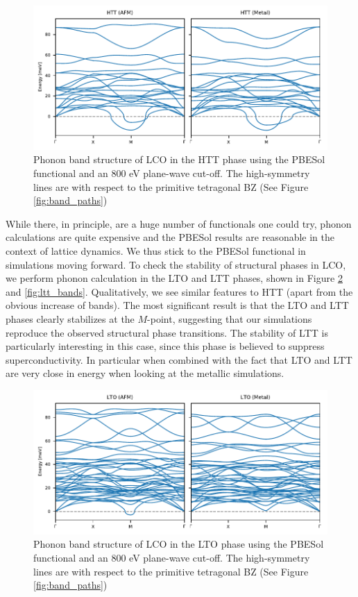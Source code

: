 \begin{figure}
	\centering
	\includegraphics[width=\textwidth]{fig/simulation/htt_bands.pdf}
	\caption[HTT Bands]{Phonon band structure of LCO in the HTT phase using the PBESol functional and an 800 eV plane-wave cut-off. The high-symmetry lines are with respect to the primitive tetragonal BZ (See Figure \ref{fig:band_paths})}
	\label{fig:htt_bands}
\end{figure}

While there, in principle, are a huge number of functionals one could try, phonon calculations are quite expensive and the PBESol results are reasonable in the context of lattice dynamics. We thus stick to the PBESol functional in simulations moving forward. To check the stability of structural phases in LCO, we perform phonon calculation in the LTO and LTT phases, shown in Figure \ref{fig:lto_bands} and \ref{fig:ltt_bands}. Qualitatively, we see similar features to HTT (apart from the obvious increase of bands). The most significant result is that the LTO and LTT phases clearly stabilizes at the $M$-point, suggesting that our simulations reproduce the observed structural phase transitions. The stability of LTT is particularly interesting in this case, since this phase is believed to suppress superconductivity. In particular when combined with the fact that LTO and LTT are very close in energy when looking at the metallic simulations.

\begin{figure}
	\centering
	\includegraphics[width=\textwidth]{fig/simulation/lto_bands.pdf}
	\caption[LTO Bands]{Phonon band structure of LCO in the LTO phase using the PBESol functional and an 800 eV plane-wave cut-off. The high-symmetry lines are with respect to the primitive tetragonal BZ (See Figure \ref{fig:band_paths})}
	\label{fig:lto_bands}
\end{figure}

